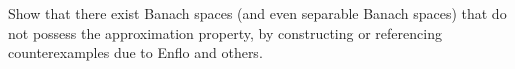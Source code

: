 Show that there exist Banach spaces (and even separable Banach spaces) that do not possess the approximation property, by constructing or referencing counterexamples due to Enflo and others.
